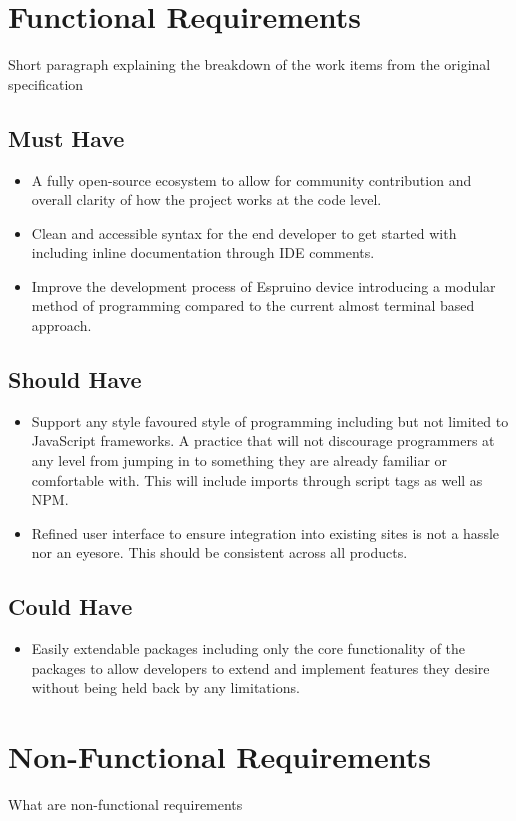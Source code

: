 \documentclass{l4proj}
\begin{document}
\section{Functional Requirements}
Short paragraph explaining the breakdown of the work items from the original specification
\subsection{Must Have}
\begin{itemize}
    \item A fully open-source ecosystem to allow for community contribution and overall clarity of how the project works at the code level.
    \item Clean and accessible syntax for the end developer to get started with including inline documentation through IDE comments.
    \item Improve the development process of Espruino device introducing a modular method of programming compared to the current almost terminal based approach.
\end{itemize}
\subsection{Should Have}
\begin{itemize}
    \item Support any style favoured style of programming including but not limited to JavaScript frameworks. A practice that will not discourage programmers at any level from jumping in to something they are already familiar or comfortable with. This will include imports through script tags as well as NPM.
    \item Refined user interface to ensure integration into existing sites is not a hassle nor an eyesore. This should be consistent across all products.
\end{itemize}
\subsection{Could Have}
\begin{itemize}
    \item Easily extendable packages including only the core functionality of the packages to allow developers to extend and implement features they desire without being held back by any limitations.
\end{itemize}
\section{Non-Functional Requirements}
\text What are non-functional requirements
\end{document}
